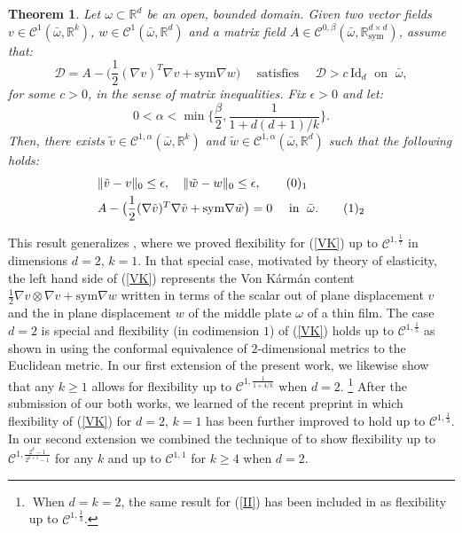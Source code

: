 \documentclass[reqno,twoside,11pt]{amsart}
\newcommand{\sym}{\mathrm{sym}}
\newcommand{\Id}{\mathrm{Id}}
\newcommand{\R}{\mathbb{R}}
\numberwithin{equation}{section}
\theoremstyle{plain}
\newtheorem{theorem}{Theorem}[section]
\theoremstyle{definition}
\begin{document}
\begin{theorem}\label{th_final}
Let $\omega\subset\R^d$ be an open, bounded domain. Given
two vector fields $v\in\mathcal{C}^1(\bar\omega,\R^k)$, $w\in\mathcal{C}^1(\bar\omega,\R^d)$ and
a matrix field $A\in\mathcal{C}^{0,\beta}(\bar\omega,\R^{d\times d}_\sym)$, assume that:
$$\mathcal{D}=A-\big(\frac{1}{2}(\nabla v)^T\nabla v + \sym\nabla
w\big) \quad\mbox{ satisfies } \quad \mathcal{D}>c\,\Id_d \; \mbox{ on } \; \bar\omega,$$
for some $c>0$, in the sense of matrix inequalities. Fix $\epsilon>0$ and let:
$$0<\alpha<\min\Big\{\frac{\beta}{2},\frac{1}{1+d(d+1)/k}\Big\}.$$ 
Then, there exists $\tilde v\in\mathcal{C}^{1,\alpha}(\bar \omega,\R^k)$ and
$\tilde w\in\mathcal{C}^{1,\alpha}(\bar\omega,\R^d)$ such that the following holds:
\begin{align*}
& \|\tilde v - v\|_0\leq \epsilon, \quad \|\tilde w - w\|_0\leq \epsilon,
\tag*{(\theequation)$_1$}\refstepcounter{equation} \label{FFbound1}\vspace{1mm}\\ 
& A -\big(\frac{1}{2}(\nabla \tilde v)^T\nabla \tilde v + \sym\nabla
\tilde w\big) =0 \quad \mbox{ in }\;\bar\omega.
\tag*{(\theequation)$_2$} \label{FFbound2}
\end{align*}
\end{theorem}

\smallskip

\noindent This result generalizes \cite[Theorem 1.1]{lewpak_MA},
where we proved flexibility for (\ref{VK}) up to $\mathcal{C}^{1,\frac{1}{7}}$ in dimensions
$d=2$, $k=1$. In that special case, motivated
by theory of elasticity, the left hand side of (\ref{VK}) represents the Von K\'arm\'an
content $\frac{1}{2}\nabla v\otimes \nabla v +\sym\nabla w$
written in terms of the scalar out of plane displacement $v$ and the
in plane displacement $w$ of the middle plate $\omega$ of a thin
film. The case $d=2$ is special and flexibility (in codimension $1$) of (\ref{VK}) holds
up to $\mathcal{C}^{1,\frac{1}{5}}$ as shown in \cite[Theorem 1.1]{CS}
using the conformal equivalence of $2$-dimensional metrics to the Euclidean metric.
In our first extension \cite{lew_improved} of the present work,
we likewise show that any $k\geq 1$ allows for flexibility up to
$\mathcal{C}^{1,\frac{1}{1+4/k}}$  when $d=2$. 
\footnote{ $\;$When $d=k=2$, the same result for (\ref{II}) has been included in
\cite{CS_new} as flexibility up to $\mathcal{C}^{1,\frac{1}{3}}$. }
After the submission of
our both works, we learned of the recent preprint \cite{CHI} in which
flexibility of (\ref{VK}) for $d=2$, $k=1$ has been further improved to
hold up to $\mathcal{C}^{1,\frac{1}{3}}$.
In our second extension \cite{lew_improved2} we combined the technique
of \cite{CHI} to show flexibility up to
$\mathcal{C}^{1,\frac{2^k-1}{2^{k+1}-1}}$ for any $k$ and up to
$\mathcal{C}^{1,1}$ for $k\geq 4$ when $d=2$.
\end{document}
